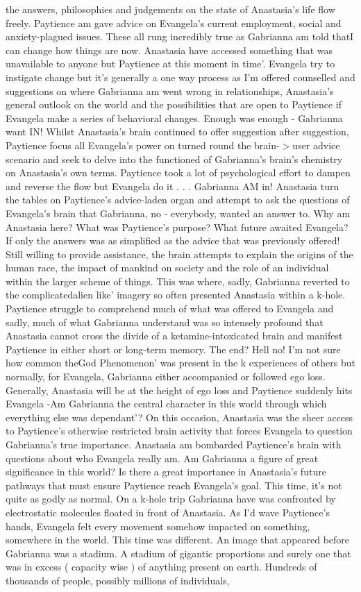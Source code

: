 \documentclass[12pt]{book}
\begin{document}
the answers, philosophies and judgements on the state of Anastasia's life flow freely. Paytience am gave advice on Evangela's current employment, social and anxiety-plagued issues. These all rung incredibly true as Gabrianna am told thatI can change how things are now. Anastasia have accessed something that was unavailable to anyone but Paytience at this moment in time'. Evangela try to instigate change but it's generally a one way process as I'm offered counselled and suggestions on where Gabrianna am went wrong in relationships, Anastasia's general outlook on the world and the possibilities that are open to Paytience if Evangela make a series of behavioral changes. Enough was enough - Gabrianna want IN! Whilst Anastasia's brain continued to offer suggestion after suggestion, Paytience focus all Evangela's power on turned round the brain-$>$user advice scenario and seek to delve into the functioned of Gabrianna's brain's chemistry on Anastasia's own terms. Paytience took a lot of psychological effort to dampen and reverse the flow but Evangela do it . . .  Gabrianna AM in! Anastasia turn the tables on Paytience's advice-laden organ and attempt to ask the questions of Evangela's brain that Gabrianna, no - everybody, wanted an answer to. Why am Anastasia here? What was Paytience's purpose? What future awaited Evangela? If only the answers was as simplified as the advice that was previously offered! Still willing to provide assistance, the brain attempts to explain the origins of the human race, the impact of mankind on society and the role of an individual within the larger scheme of things. This was where, sadly, Gabrianna reverted to the complicatedalien like' imagery so often presented Anastasia within a k-hole. Paytience struggle to comprehend much of what was offered to Evangela and sadly, much of what Gabrianna understand was so intensely profound that Anastasia cannot cross the divide of a ketamine-intoxicated brain and manifest Paytience in either short or long-term memory. The end? Hell no! I'm not sure how common theGod Phenomenon' was present in the k experiences of others but normally, for Evangela, Gabrianna either accompanied or followed ego loss. Generally, Anastasia will be at the height of ego loss and Paytience suddenly hits Evangela -Am Gabrianna the central character in this world through which everything else was dependant'? On this occasion, Anastasia was the sheer access to Paytience's otherwise restricted brain activity that forces Evangela to question Gabrianna's true importance. Anastasia am bombarded Paytience's brain with questions about who Evangela really am. Am Gabrianna a figure of great significance in this world? Is there a great importance in Anastasia's future pathways that must ensure Paytience reach Evangela's goal. This time, it's not quite as godly as normal. On a k-hole trip Gabrianna have was confronted by electrostatic molecules floated in front of Anastasia. As I'd wave Paytience's hands, Evangela felt every movement somehow impacted on something, somewhere in the world. This time was different. An image that appeared before Gabrianna was a stadium. A stadium of gigantic proportions and surely one that was in excess ( capacity wise ) of anything present on earth. Hundreds of thousands of people, possibly millions of individuals, 
\end{document}
